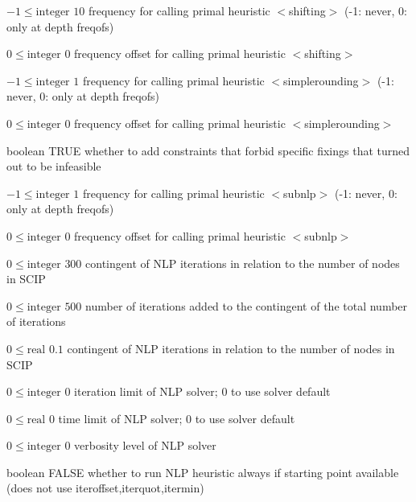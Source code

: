 %
{$-1\leq\textrm{integer}$}%
{$10$}%
{frequency for calling primal heuristic $<$shifting$>$ (-1: never, 0: only at depth freqofs)}%
{}

%
{$0\leq\textrm{integer}$}%
{$0$}%
{frequency offset for calling primal heuristic $<$shifting$>$}%
{}

%
{$-1\leq\textrm{integer}$}%
{$1$}%
{frequency for calling primal heuristic $<$simplerounding$>$ (-1: never, 0: only at depth freqofs)}%
{}

%
{$0\leq\textrm{integer}$}%
{$0$}%
{frequency offset for calling primal heuristic $<$simplerounding$>$}%
{}

%
{boolean}%
{TRUE}%
{whether to add constraints that forbid specific fixings that turned out to be infeasible}%
{}

%
{$-1\leq\textrm{integer}$}%
{$1$}%
{frequency for calling primal heuristic $<$subnlp$>$ (-1: never, 0: only at depth freqofs)}%
{}

%
{$0\leq\textrm{integer}$}%
{$0$}%
{frequency offset for calling primal heuristic $<$subnlp$>$}%
{}

%
{$0\leq\textrm{integer}$}%
{$300$}%
{contingent of NLP iterations in relation to the number of nodes in SCIP}%
{}

%
{$0\leq\textrm{integer}$}%
{$500$}%
{number of iterations added to the contingent of the total number of iterations}%
{}

%
{$0\leq\textrm{real}$}%
{$0.1$}%
{contingent of NLP iterations in relation to the number of nodes in SCIP}%
{}

%
{$0\leq\textrm{integer}$}%
{$0$}%
{iteration limit of NLP solver; 0 to use solver default}%
{}

%
{$0\leq\textrm{real}$}%
{$0$}%
{time limit of NLP solver; 0 to use solver default}%
{}

%
{$0\leq\textrm{integer}$}%
{$0$}%
{verbosity level of NLP solver}%
{}

%
{boolean}%
{FALSE}%
{whether to run NLP heuristic always if starting point available (does not use iteroffset,iterquot,itermin)}%
{}

